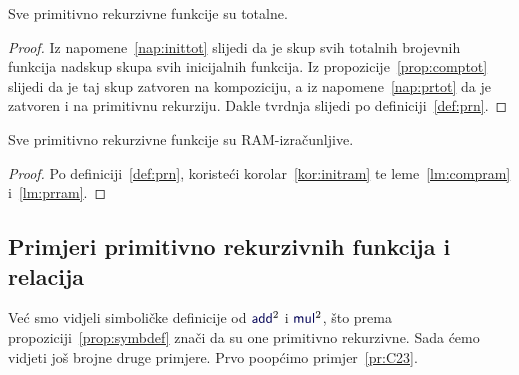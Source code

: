 \begin{propozicija}[{name=[totalnost primitivno rekurzivnih funkcija]}]\label{prop:prntot}
Sve primitivno rekurzivne funkcije su totalne.
\end{propozicija}
\begin{proof}
    Iz napomene~\ref{nap:inittot} slijedi da je skup svih totalnih brojevnih funkcija nadskup skupa svih inicijalnih funkcija. Iz propozicije~\ref{prop:comptot} slijedi da je taj skup zatvoren na kompoziciju, a iz napomene~\ref{nap:prtot} da je zatvoren i na primitivnu rekurziju. Dakle tvrdnja slijedi po definiciji~\ref{def:prn}.
\end{proof}

\begin{propozicija}[{name=[RAM-izračunljivost primitivno rekurzivnih funkcija]}]\label{prop:prnram}
Sve primitivno rekurzivne funkcije su RAM-izračunljive.
\end{propozicija}
\begin{proof}
Po definiciji~\ref{def:prn}, koristeći korolar~\ref{kor:initram} te leme~\ref{lm:compram} i~\ref{lm:prram}.
\end{proof}

\subsection{Primjeri primitivno rekurzivnih funkcija i relacija}

Već smo vidjeli simboličke definicije od $\f{add}^2$ i $\f{mul}^2$, što prema propoziciji~\ref{prop:symbdef} znači da su one primitivno rekurzivne. Sada ćemo vidjeti još brojne druge primjere. Prvo poopćimo primjer~\ref{pr:C23}.

